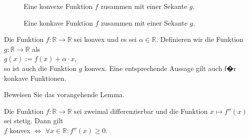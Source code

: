 \begin{figure}[!h]
  \centering
   \caption{Eine konvexe Funktion $f$ zusammen mit einer Sekante $g$.}
  \label{fig:convex.eps}
\end{figure}
\begin{figure}[!h]
  \centering
   \caption{Eine konkave Funktion $f$ zusammen mit einer Sekante $g$.}
  \label{fig:concav.eps}
\end{figure}
\pagebreak



\begin{Lemma}
  \label{lemma:konvex_invarianz} \lb
  Die Funktion $f:\mathbb{R} \rightarrow \mathbb{R}$ sei konvex und es sei $\alpha \in \mathbb{R}$.
  Definieren wir die Funktion $g:\mathbb{R} \rightarrow \mathbb{R}$ als
  \\[0.2cm]
  \hspace*{1.3cm}
  $g(x) := f(x) + \alpha \cdot x$,
  \\[0.2cm]
  so ist auch die Funktion $g$ konvex.  Eine entsprechende Aussage gilt auch f�r konkave Funktionen.
\end{Lemma}

\exercise
Beweisen Sie das vorangehende Lemma.

\begin{Satz}
Die Funktion $f:\mathbb{R} \rightarrow \mathbb{R}$ sei zweimal differenzierbar und die Funktion 
$x \mapsto f''(x)$ sei stetig.  Dann gilt 
\\[0.2cm]
\hspace*{1.3cm}
$f$  konvex \quad $\Leftrightarrow$ \quad $\forall x \in \mathbb{R}: f''(x) \geq 0$.
\end{Satz}

